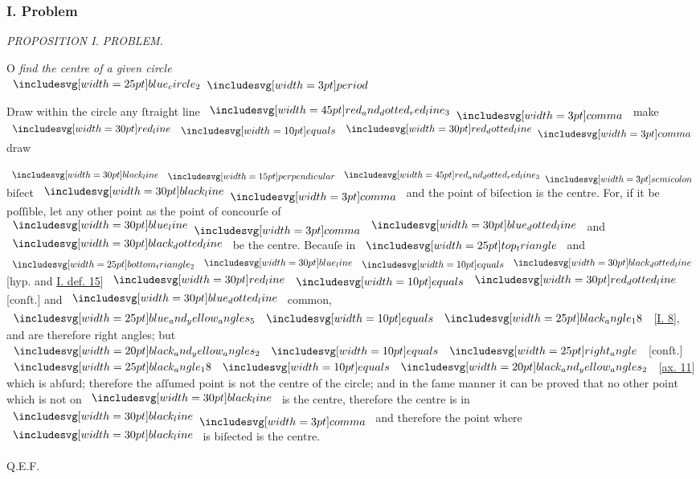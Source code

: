 \documentclass[11pt,preview]{standalone}
\begin{document}
\subsubsection{I. Problem}

\hfill

\begin{minipage}[t]{0.43\textwidth}
    \vspace{5pt}
    
\end{minipage}%
\hfill
\begin{minipage}[t]{0.54\textwidth}
    \begin{center}
        \textit{PROPOSITION I. PROBLEM.}\label{book3pr1} \\
    \end{center}

    \hfill

    \begin{center}
        \raggedright \lettrine[lines=3, loversize=1, nindent=0pt]{}{}O \textit{find the centre of a given circle}\\ $\img{blue_circle_2} \bperiod$
    \end{center}

    \hfill

    \hfill

    \raggedright Draw within the circle any ſtraight line $\bimg{red_and_dotted_red_line_3} \bcomma$ make $\redline \bequals \dottedredline \bcomma$ draw
\end{minipage}%

\raggedright $\blackline \bperp \bimg{red_and_dotted_red_line_3} \bsemicolon$ biſect $\blackline \bcomma$ and the point of biſection is the centre. For, if it be poſſible, let any other point as the point of concourſe of $\blueline \bcomma \dottedblueline$ and $\dottedblackline$ be the centre. Becauſe in $\img{top_triangle}$ and $\img{bottom_triangle_2} \blueline \bequals \dottedblackline$ [hyp. and \hyperref[book1def15]{\textsc{I.} def. 15}] $\redline \bequals \dottedredline$ [conſt.] and $\dottedblueline$ common, $\img{blue_and_yellow_angles_5} \bequals \img{black_angle_18}$ [\hyperref[book1pr8]{\textsc{I.} 8}], and are therefore right angles; but $\img[0][0][20]{black_and_yellow_angles_2} \bequals \img{right_angle}$ [conſt.] $\img{black_angle_18} \bequals \img[0][0][20]{black_and_yellow_angles_2}$ [\hyperref[ax11]{ax. 11}] which is abſurd; therefore the aſſumed point is not the centre of the circle;
and in the ſame manner it can be proved that no other point which is not on $\blackline$ is the centre, therefore the centre is in $\blackline \bcomma$ and therefore the point where $\blackline$ is biſected is the centre.

\hfill

\hfill Q.E.F.
\end{document}
